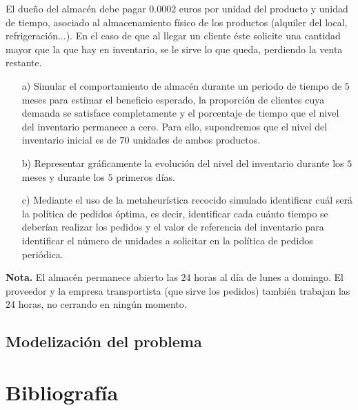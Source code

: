 \documentclass[a4paper,12pt]{article}
\begin{document}
	
	El dueño del almacén debe pagar $0.0002$ euros por unidad del producto y
unidad de tiempo, asociado al almacenamiento físico de los productos (alquiler
del local, refrigeración...).
En el caso de que al llegar un cliente éste solicite una cantidad mayor que la que
hay en inventario, se le sirve lo que queda, perdiendo la venta restante.
	
	\begin{enumerate}
		\item[a)] Simular el comportamiento de almacén durante un periodo de tiempo de $5$
meses para estimar el beneficio esperado, la proporción de clientes cuya
demanda se satisface completamente y el porcentaje de tiempo que el nivel del
inventario permanece a cero. Para ello, supondremos que el nivel del inventario
inicial es de $70$ unidades de ambos productos.
		\item[b)] Representar gráficamente la evolución del nivel del inventario durante los $5$
meses y durante los $5$ primeros días.
		\item[c)] Mediante el uso de la metaheurística recocido simulado identificar cuál será la
política de pedidos óptima, es decir, identificar cada cuánto tiempo se deberían
realizar los pedidos y el valor de referencia del inventario para identificar el
número de unidades a solicitar en la política de pedidos periódica.
	\end{enumerate}

	\textbf{Nota.} El almacén permanece abierto las $24$ horas al día de lunes a domingo. El
proveedor y la empresa transportista (que sirve los pedidos) también trabajan
las $24$ horas, no cerrando en ningún momento.
	\subsection{Modelización del problema}
	
	
\newpage
	\section*{Bibliografía}
	
	
	
\end{document}
